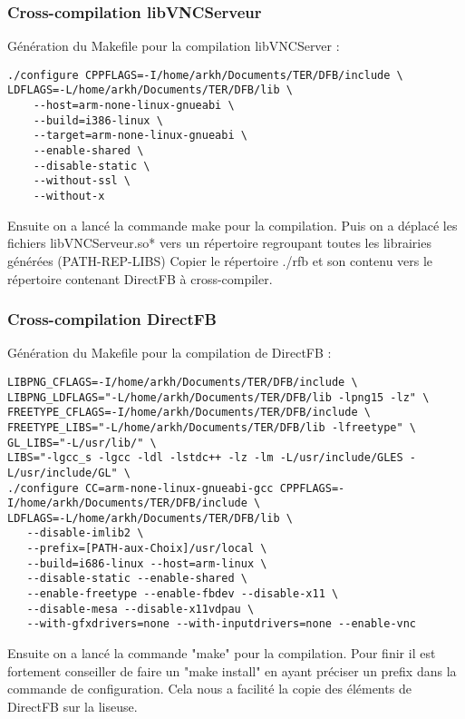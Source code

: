\subsubsection{Cross-compilation libVNCServeur}

Génération du Makefile pour la compilation libVNCServer :

\begin{lstlisting}
./configure CPPFLAGS=-I/home/arkh/Documents/TER/DFB/include \
LDFLAGS=-L/home/arkh/Documents/TER/DFB/lib \  
	--host=arm-none-linux-gnueabi \
	--build=i386-linux \
	--target=arm-none-linux-gnueabi \ 
	--enable-shared \
	--disable-static \
	--without-ssl \
	--without-x
\end{lstlisting}

Ensuite on a lancé la commande make pour la compilation.
Puis on a déplacé les fichiers libVNCServeur.so* vers un répertoire regroupant toutes les librairies générées (PATH-REP-LIBS)
Copier le répertoire ./rfb et son contenu vers le répertoire contenant DirectFB à cross-compiler.

\subsubsection{Cross-compilation DirectFB}

Génération du Makefile pour la compilation de DirectFB :

\begin{lstlisting}
LIBPNG_CFLAGS=-I/home/arkh/Documents/TER/DFB/include \
LIBPNG_LDFLAGS="-L/home/arkh/Documents/TER/DFB/lib -lpng15 -lz" \
FREETYPE_CFLAGS=-I/home/arkh/Documents/TER/DFB/include \
FREETYPE_LIBS="-L/home/arkh/Documents/TER/DFB/lib -lfreetype" \
GL_LIBS="-L/usr/lib/" \
LIBS="-lgcc_s -lgcc -ldl -lstdc++ -lz -lm -L/usr/include/GLES -L/usr/include/GL" \
./configure CC=arm-none-linux-gnueabi-gcc CPPFLAGS=-I/home/arkh/Documents/TER/DFB/include \
LDFLAGS=-L/home/arkh/Documents/TER/DFB/lib \
   --disable-imlib2 \
   --prefix=[PATH-aux-Choix]/usr/local \
   --build=i686-linux --host=arm-linux \
   --disable-static --enable-shared \
   --enable-freetype --enable-fbdev --disable-x11 \
   --disable-mesa --disable-x11vdpau \
   --with-gfxdrivers=none --with-inputdrivers=none --enable-vnc
\end{lstlisting}

Ensuite on a lancé la commande "make" pour la compilation. Pour finir il est fortement conseiller de faire un "make install" en ayant préciser un prefix dans la commande de configuration. Cela nous a facilité la copie des éléments de DirectFB sur la liseuse. 

